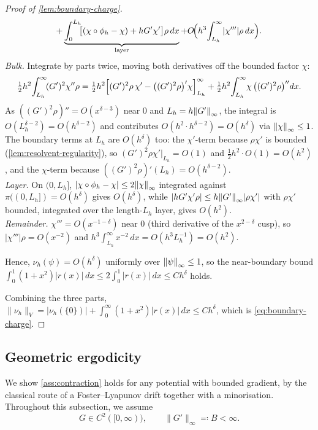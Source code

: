 \documentclass[aap,preprint]{imsart}
\DeclarePairedDelimiter{\Vpair}{\|}{\|} %
\newcommand\norm[2][0pt]{\Vpair*{#2}} %
\newcommand\snorm[1]{\norm{\smash{#1}}} %
\numberwithin{equation}{section}
\theoremstyle{plain}
\theoremstyle{definition}
\begin{document}
\begin{proof}[Proof of \cref{lem:boundary-charge}]
\begin{equation}
   +\underbrace{\int_0^{L_h}\!\!\bigl[(\chi\circ\phi_h-\chi)+hG'\chi'\bigr]\rho\,dx}_{\text{layer}}
   +O\!\Bigl(h^3\!\int_{L_h}^\infty\!|\chi'''|\rho\,dx\Bigr).
\end{equation}
\emph{Bulk.}  Integrate by parts twice, moving both derivatives off the bounded factor $\chi$:
\[
  \tfrac12h^2\!\int_{L_h}^\infty\!(G')^2\chi''\rho
   =\tfrac12h^2\Bigl[(G')^2\rho\,\chi'-\bigl((G')^2\rho\bigr)'\chi\Bigr]_{L_h}^\infty
   +\tfrac12h^2\!\int_{L_h}^\infty\!\chi\,\bigl((G')^2\rho\bigr)''dx .
\]
As $((G')^2\rho)''=O(x^{\delta-3})$ near $0$ and $L_h=h\snorm{G'}_\infty$, the integral is $O(L_h^{\delta-2})=O(h^{\delta-2})$ and contributes $O(h^2\cdot h^{\delta-2})=O(h^\delta)$ via $\snorm{\chi}_\infty\le1$.  The boundary terms at $L_h$ are $O(h^\delta)$ too: the $\chi'$-term because $\rho\chi'$ is bounded (\cref{lem:resolvent-regularity}), so $(G')^2\rho\chi'|_{L_h}=O(1)$ and $\tfrac12h^2\cdot O(1)=O(h^2)$, and the $\chi$-term because $((G')^2\rho)'(L_h)=O(h^{\delta-2})$. \\\emph{Layer.}  On $(0,L_h]$, $|\chi\circ\phi_h-\chi|\le2\snorm{\chi}_\infty$ integrated against $\pi((0,L_h])=O(h^\delta)$ gives $O(h^\delta)$, while $|hG'\chi'\rho|\le h\snorm{G'}_\infty|\rho\chi'|$ with $\rho\chi'$ bounded, integrated over the length-$L_h$ layer, gives $O(h^2)$.\\  \emph{Remainder.}  $\chi'''=O(x^{-1-\delta})$ near $0$ (third derivative of the $x^{2-\delta}$ cusp), so $|\chi'''|\rho=O(x^{-2})$ and $h^3\int_{L_h}^\infty x^{-2}\,dx=O(h^3 L_h^{-1})=O(h^2)$.  

Hence, $\nu_h(\psi)=O(h^\delta)$ uniformly over $\snorm{\psi}_\infty\le1$, so the near-boundary bound $\int_0^1(1+x^2)|r(x)|\,dx\le 2\int_0^1|r(x)|\,dx\le Ch^\delta$ holds.

Combining the three parts, $\|\nu_h\|_V=|\nu_h(\{0\})|+\int_0^\infty(1+x^2)|r(x)|\,dx\le Ch^\delta$, which is \eqref{eq:boundary-charge}.
\end{proof}



\subsection{Geometric ergodicity}\label{app:contraction-nonconvex}

We show \cref{ass:contraction} holds for any potential with bounded gradient, by the classical route of a
Foster--Lyapunov drift together with a minorisation. 
Throughout this subsection, we assume
\begin{equation}\label{eq:nonconvex-hyp}
  G\in C^2([0,\infty)),\qquad \|G'\|_\infty\eqqcolon B<\infty.
\end{equation} 
\end{document}
